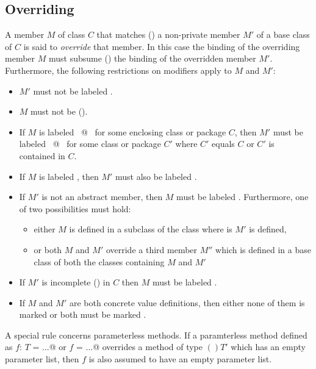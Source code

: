 \subsection{Overriding}
\label{sec:overriding}


A member $M$ of class $C$ that matches () 
a non-private member $M'$ of a
base class of $C$ is said to {\em override} that member.  In this case
the binding of the overriding member $M$ must subsume
() the binding of the overridden member $M'$.
Furthermore, the following restrictions on modifiers apply to $M$ and
$M'$:
\begin{itemize}
\item
$M'$ must not be labeled .
\item
$M$ must not be  ().
\item
If $M$ is labeled ~\lstinline@private[$C$]@~ for some enclosing class or package $C$,
then $M'$ must be labeled ~\lstinline@private[$C'$]@~ for some class or package $C'$ where
$C'$ equals $C$ or $C'$ is contained in $C$. 
\item
If $M$ is labeled , then $M'$ must also be
labeled .
\item
If $M'$ is not an abstract member, then
$M$ must be labeled .
Furthermore, one of two possibilities must hold:
\begin{itemize}
\item either $M$ is defined in a subclass of the class where is $M'$ is defined, 
\item or both $M$ and $M'$ override a third member $M''$ which is defined
      in a base class of both the classes containing $M$ and $M'$ 
\end{itemize}
\item
If $M'$ is incomplete () in $C$ then $M$ must be
labeled .
\item 
If $M$ and $M'$ are both concrete value definitions, then either none
of them is marked  or both must be marked .
\end{itemize}
A special rule concerns parameterless methods. If a paramterless
method defined as \lstinline@def $f$: $T$ = ...@ or 
\lstinline@def $f$ = ...@ overrides a method of
type $()T'$ which has an empty parameter list, then $f$ is also
assumed to have an empty parameter list.

